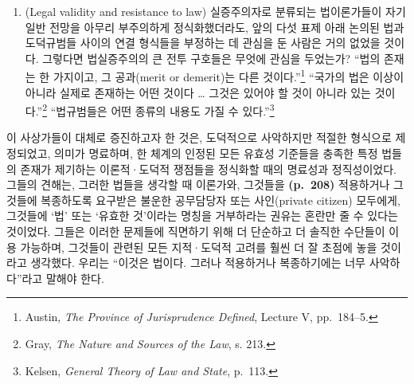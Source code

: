\begin{enumerate}
\def\labelenumi{(\roman{enumi})}
\setcounter{enumi}{5}
\tightlist
\item
   (Legal validity and resistance to
  law) 실증주의자로 분류되는 법이론가들이 자기 일반 전망을 아무리
  부주의하게 정식화했더라도, 앞의 다섯 표제 아래 논의된 법과 도덕규범들
  사이의 연결 형식들을 부정하는 데 관심을 둔 사람은 거의 없었을 것이다.
  그렇다면 법실증주의의 큰 전투 구호들은 무엇에 관심을 두었는가? “법의
  존재는 한 가지이고, 그 공과(merit or demerit)는 다른
  것이다.”\footnote{Austin, \emph{The Province of Jurisprudence
    Defined}, Lecture V, pp.~184--5.} “국가의 법은 이상이 아니라 실제로
  존재하는 어떤 것이다 \ldots{} 그것은 있어야 할 것이 아니라 있는
  것이다.”\footnote{Gray, \emph{The Nature and Sources of the Law}, s.
    213.} “법규범들은 어떤 종류의 내용도 가질 수 있다.”\footnote{Kelsen,
    \emph{General Theory of Law and State}, p.~113.}
\end{enumerate}

이 사상가들이 대체로 증진하고자 한 것은, 도덕적으로 사악하지만 적절한
형식으로 제정되었고, 의미가 명료하며, 한 체계의 인정된 모든 유효성
기준들을 충족한 특정 법들의 존재가 제기하는 이론적·도덕적 쟁점들을
정식화할 때의 명료성과 정직성이었다. 그들의 견해는, 그러한 법들을 생각할
때 이론가와, 그것들을 \textbf{(p.~208)} 적용하거나 그것들에 복종하도록
요구받은 불운한 공무담당자 또는 사인(private citizen) 모두에게, 그것들에
‘법’ 또는 ‘유효한 것’이라는 명칭을 거부하라는 권유는 혼란만 줄 수 있다는
것이었다. 그들은 이러한 문제들에 직면하기 위해 더 단순하고 더 솔직한
수단들이 이용 가능하며, 그것들이 관련된 모든 지적·도덕적 고려를 훨씬 더
잘 초점에 놓을 것이라고 생각했다. 우리는 “이것은 법이다. 그러나
적용하거나 복종하기에는 너무 사악하다”라고 말해야 한다.

